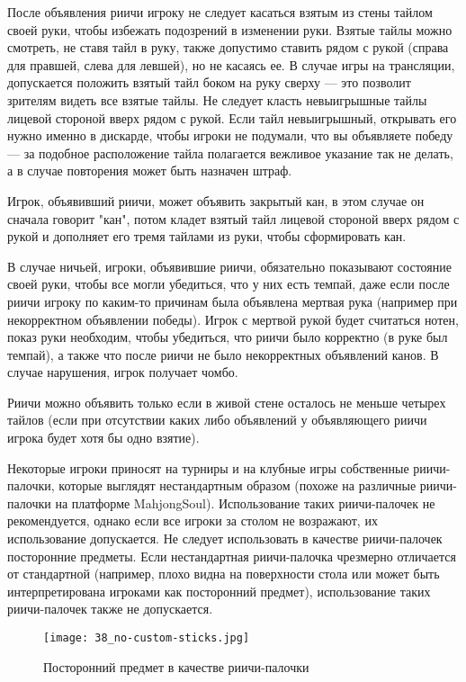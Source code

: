 После объявления риичи игроку не следует касаться взятым из стены тайлом своей руки, чтобы избежать подозрений в изменении руки. Взятые тайлы можно смотреть, не ставя тайл в руку, также допустимо ставить рядом с рукой (справа для правшей, слева для левшей), но не касаясь ее. В случае игры на трансляции, допускается положить взятый тайл боком на руку сверху --- это позволит зрителям видеть все взятые тайлы. Не следует класть невыигрышные тайлы лицевой стороной вверх рядом с рукой. Если тайл невыигрышный, открывать его нужно именно в дискарде, чтобы игроки не подумали, что вы объявляете победу --- за подобное расположение тайла полагается вежливое указание так не делать, а в случае повторения может быть назначен штраф.

Игрок, объявивший риичи, может объявить закрытый кан, в этом случае он сначала говорит "кан", потом кладет взятый тайл лицевой стороной вверх рядом с рукой и дополняет его тремя тайлами из руки, чтобы сформировать кан.

В случае ничьей, игроки, объявившие риичи, обязательно показывают состояние своей руки, чтобы все могли убедиться, что у них есть темпай, даже если после риичи игроку по каким-то причинам была объявлена мертвая рука (например при некорректном объявлении победы). Игрок с мертвой рукой будет считаться нотен, показ руки необходим, чтобы убедиться, что риичи было корректно (в руке был темпай), а также что после риичи не было некорректных объявлений канов. В случае нарушения, игрок получает чомбо.

Риичи можно объявить только если в живой стене осталось не меньше четырех тайлов (если при отсутствии каких либо объявлений у объявляющего риичи игрока будет хотя бы одно взятие). 

Некоторые игроки приносят на турниры и на клубные игры собственные риичи-палочки, которые выглядят нестандартным образом (похоже на различные риичи-палочки на платформе MahjongSoul). Использование таких риичи-палочек не рекомендуется, однако если все игроки за столом не возражают, их использование допускается. Не следует использовать в качестве риичи-палочек посторонние предметы. Если нестандартная риичи-палочка чрезмерно отличается от стандартной (например, плохо видна на поверхности стола или может быть интерпретирована игроками как посторонний предмет), использование таких риичи-палочек также не допускается.

\begin{figure}[H]
	\centering
	\texttt{[image: 38\_no-custom-sticks.jpg]}
	\caption{Посторонний предмет в качестве риичи-палочки}
\end{figure}

